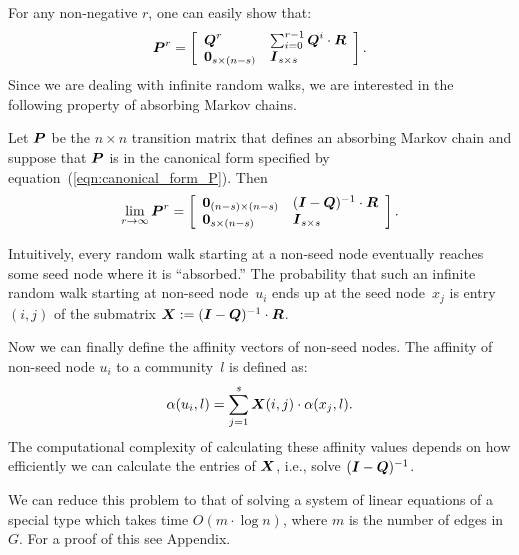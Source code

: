 For any non-negative $r$, one can easily show that:
\begin{equation}\label{exp:rth_product_of_P}
	\boldsymbol{P}^r = \left [ \begin{array}{ll}
						\boldsymbol{Q}^r  					& \sum_{i = 0}^{r - 1}\boldsymbol{Q}^i \cdot \boldsymbol{R} \\
						 \boldsymbol{0}_{s \times (n - s)} & \boldsymbol{I}_{s \times s}
						\end{array}
				\right ].
\end{equation}  
Since we are dealing with infinite random walks, we are interested in the following 
property of absorbing Markov chains.
\begin{proposition}\label{prop:limiting_Q}
	Let $\boldsymbol{P}$ be the $n \times n$ transition matrix that defines an absorbing Markov chain
	and suppose that $\boldsymbol{P}$ is in the canonical form specified by equation~(\ref{eqn:canonical_form_P}). 
	Then
    \begin{equation}
        \lim_{r \to \infty} \boldsymbol{P}^r = \left [ \begin{array}{ll}
            \boldsymbol{0}_{(n - s) \times (n - s)} & (\boldsymbol{I} - \boldsymbol{Q})^{-1} \cdot \boldsymbol{R} \\
            \boldsymbol{0}_{s \times (n - s)}       & \boldsymbol{I}_{s \times s}
        \end{array}
        \right ].
    \end{equation}  
\end{proposition}
Intuitively, every random walk starting at a non-seed node eventually 
reaches some seed node where it is ``absorbed.'' The probability 
that such an infinite random walk starting at non-seed node~$u_i$ ends 
up at the seed node~$x_j$ is entry $(i, j)$ of the 
submatrix $\boldsymbol{X} := (\boldsymbol{I} - \boldsymbol{Q})^{-1} \cdot \boldsymbol{R}$. 

Now we can finally define the affinity vectors of non-seed nodes.
The affinity of non-seed node $u_i$ to a community~$l$ is defined as:
\begin{equation}\label{eqn:belonging_vector}
    \alpha (u_i, l) = \sum_{j = 1}^{s} \boldsymbol{X} (i, j) \cdot \alpha (x_j, l).
\end{equation}
The computational complexity of calculating these affinity values  
depends on how efficiently we can calculate the entries of $\boldsymbol{X}$, 
i.e., solve $(\boldsymbol{I} - \boldsymbol{Q})^{-1}$. 

We can reduce this problem to that of solving a system of linear equations 
of a special type which takes time $O(m \cdot \log n)$, where $m$
is the number of edges in $G$. For a proof of this see Appendix.  
 
